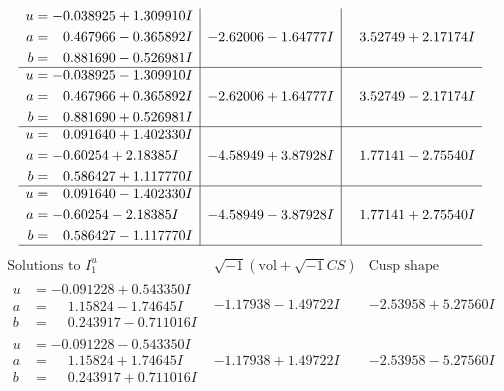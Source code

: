 \documentclass[1p]{elsarticle_modified}
\theoremstyle{definition}
\newcommand{\I}{\sqrt{-1}}
\begin{document}
$$\begin{array}{c|c|c}
\begin{aligned}
u &= -0.038925 + 1.309910 I \\
a &= \phantom{-}0.467966 - 0.365892 I \\
b &= \phantom{-}0.881690 - 0.526981 I\end{aligned}
 & -2.62006 - 1.64777 I & \phantom{-}3.52749 + 2.17174 I \\ \hline\begin{aligned}
u &= -0.038925 - 1.309910 I \\
a &= \phantom{-}0.467966 + 0.365892 I \\
b &= \phantom{-}0.881690 + 0.526981 I\end{aligned}
 & -2.62006 + 1.64777 I & \phantom{-}3.52749 - 2.17174 I \\ \hline\begin{aligned}
u &= \phantom{-}0.091640 + 1.402330 I \\
a &= -0.60254 + 2.18385 I \\
b &= \phantom{-}0.586427 + 1.117770 I\end{aligned}
 & -4.58949 + 3.87928 I & \phantom{-}1.77141 - 2.75540 I \\ \hline\begin{aligned}
u &= \phantom{-}0.091640 - 1.402330 I \\
a &= -0.60254 - 2.18385 I \\
b &= \phantom{-}0.586427 - 1.117770 I\end{aligned}
 & -4.58949 - 3.87928 I & \phantom{-}1.77141 + 2.75540 I\\
 \hline 
 \end{array}$$\newpage$$\begin{array}{c|c|c}  
\text{Solutions to }I^u_{1}& \I (\text{vol} + \sqrt{-1}CS) & \text{Cusp shape}\\
 \hline 
\begin{aligned}
u &= -0.091228 + 0.543350 I \\
a &= \phantom{-}1.15824 - 1.74645 I \\
b &= \phantom{-}0.243917 - 0.711016 I\end{aligned}
 & -1.17938 - 1.49722 I & -2.53958 + 5.27560 I \\ \hline\begin{aligned}
u &= -0.091228 - 0.543350 I \\
a &= \phantom{-}1.15824 + 1.74645 I \\
b &= \phantom{-}0.243917 + 0.711016 I\end{aligned}
 & -1.17938 + 1.49722 I & -2.53958 - 5.27560 I \\ \hline\begin{aligned}

\end{aligned}
\end{array}$$
\end{document}
